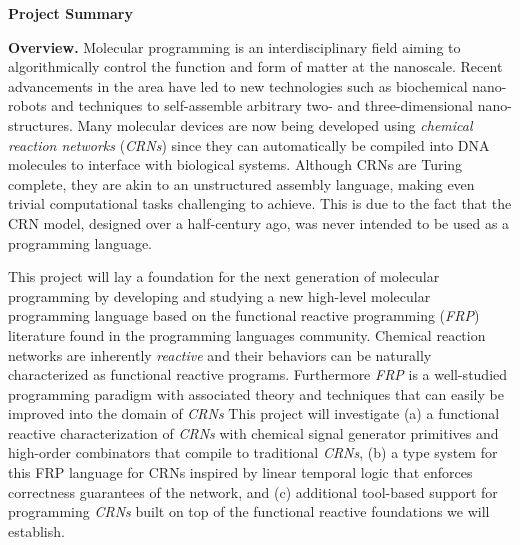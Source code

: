 \documentclass[11pt]{article}
\begin{document}
    \setcounter{page}{1}
    \begin{center}
        {\Large {\bf Project Summary}}
    \end{center}
    \vspace*{1em}

    \textbf{Overview.}
    Molecular programming is an interdisciplinary field aiming to algorithmically control the function and form of matter at the nanoscale.
    Recent advancements in the area have led to new technologies such as biochemical nano-robots and techniques to self-assemble arbitrary two- and three-dimensional nano-structures.
    Many molecular devices are now being developed using \emph{chemical reaction networks} (\emph{CRNs}) since they can automatically be compiled into DNA molecules to interface with biological systems.
    Although CRNs are Turing complete, they are akin to an unstructured assembly language, making even trivial computational tasks challenging to achieve.
    This is due to the fact that the CRN model, designed over a half-century ago, was never intended to be used as a programming language.

    This project will lay a foundation for the next generation of molecular programming by developing and studying a new high-level molecular programming language based on the functional reactive programming (\emph{FRP}) literature found in the programming languages community.
    Chemical reaction networks are inherently \emph{reactive} and their behaviors can be naturally characterized as functional reactive programs.
    Furthermore \emph{FRP} is a well-studied programming paradigm with associated theory and techniques that can easily be improved into the domain of \emph{CRNs}
    This project will investigate (a) a functional reactive characterization of \emph{CRNs} with chemical signal generator primitives and high-order combinators that compile to traditional \emph{CRNs}, (b) a type system for this FRP language for CRNs inspired by linear temporal logic that enforces correctness guarantees of the network, and (c) additional tool-based support for programming \emph{CRNs} built on top of the functional reactive foundations we will establish.
\end{document}
